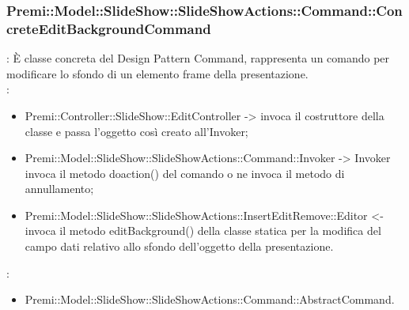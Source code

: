 {                     \subsubsection{Premi::Model::SlideShow::SlideShowActions::Command::ConcreteEditBackgroundCommand}{
				\textbf{\tipo}: È classe concreta del Design Pattern Command, rappresenta un comando per modificare lo sfondo di un elemento frame della presentazione.\\	
				\textbf{\relaz}: 
				\begin{itemize}
					\item Premi::Controller::SlideShow::EditController -> invoca il costruttore della classe e passa l’oggetto così creato all’Invoker;
					\item Premi::Model::SlideShow::SlideShowActions::Command::Invoker -> Invoker invoca il metodo doaction() del comando o ne invoca il metodo di annullamento;
                    \item Premi::Model::SlideShow::SlideShowActions::InsertEditRemove::Editor <- invoca il metodo editBackground() della classe statica per la modifica del campo dati relativo allo sfondo dell'oggetto della presentazione.
				\end{itemize}	
                \textbf{\base}: 
                    \begin{itemize}
                    \item Premi::Model::SlideShow::SlideShowActions::Command::AbstractCommand.
                    \end{itemize}
                    }
}
